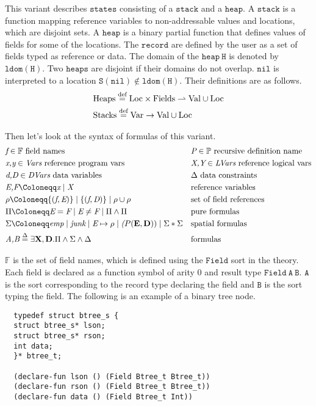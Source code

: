 \documentclass{article}
\theoremstyle{plain}
\begin{document}
This variant describes $\mathtt{states}$ consisting of a $\mathtt{stack}$ and a $\mathtt{heap}$. A $\mathtt{stack}$ is a function mapping reference variables to non-addressable values and locations, which are disjoint sets. A $\mathtt{heap}$ is a binary partial function that defines values of fields for some of the locations. The $\mathtt{record}$ are defined by the user as a set of fields typed as reference or data. The domain of the $\mathtt{heap\ H}$ is denoted by $\mathtt{ldom(H)}$. Two $\mathtt{heaps}$ are disjoint if their domains do not overlap. $\mathtt{nil}$ is interpreted to a location $\mathtt{S(nil) \notin ldom(H)}$. Their definitions are as follows.
\begin{equation*}
\begin{split}
& \mathrm{Heaps \buildrel \text{d{}ef}\over= Loc \times Fields \rightharpoonup Val\cup Loc} \\
& \mathrm{Stacks \buildrel \text{d{}ef}\over= Var \to Val \cup Loc}
\end{split}
\end{equation*}

Then let's look at the syntax of formulas of this variant.
\begin{align*}
&\emph{f} \in \mathbb{F} \ \text{field names} & &\emph{P} \in \mathbb{P} \ \text{recursive definition name}\\
&\emph{x,y} \in \emph{Vars} \ \text{reference program vars}& &\emph{X,Y} \in \emph{LVars} \ \text{reference logical vars}\\
&\emph{d,D} \in \emph{DVars} \ \text{data\ variables}& &\Delta \ \text{data constraints}\\
&\emph{E,F} \Coloneqq \emph{x} \mid \emph{X} & &\text{reference  variables}\\
&\rho \Coloneqq \{(\emph{f},\emph{E})\} \mid \{(\emph{f},\emph{D})\}  \mid \rho\cup \rho & &\text{set of field references}\\
&\Pi \Coloneqq \emph{E}=\emph{F} \mid\emph{E}\ne\emph{F}  \mid \Pi \wedge  \Pi & &\text{pure formulas}\\
&\Sigma \Coloneqq \emph{emp} \mid \emph{junk} \mid \emph{E} \mapsto \rho \mid \emph(P(\mathbf{E},\mathbf{D})) \mid \Sigma *\Sigma & &\text{spatial formulas}\\
&\emph{A,B} \overset{\Delta}{=} \exists \mathbf{X},\mathbf{D}. \Pi \wedge  \Sigma  \wedge  \Delta & &\text{formulas}\\
\end{align*}

$\mathbb{F}$ is the set of field names, which is defined using the $\mathtt{Field}$ sort in the theory. Each field is declared as a function symbol of arity 0 and result type $\mathtt{Field\ A\ B}$. $\mathtt{A}$ is the sort corresponding to the record type declaring the field and $\mathtt{B}$ is the sort typing the field. The following is an example of a binary tree node.
\begin{verbatim}
  typedef struct btree_s {
  struct btree_s* lson;
  struct btree_s* rson;
  int data;
  }* btree_t;
  
  (declare-fun lson () (Field Btree_t Btree_t))
  (declare-fun rson () (Field Btree_t Btree_t))
  (declare-fun data () (Field Btree_t Int))
\end{verbatim}
\end{document}
